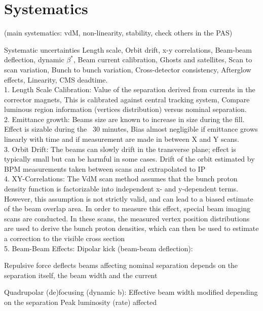 \section{Systematics}
\label{sec:syst}
(main systematics: vdM, non-linearity, stability, check others in the PAS)


Systematic uncertainties Length scale, Orbit drift, x-y correlations, Beam-beam deflection, dynamic $\beta^*$, Beam current calibration, Ghosts and satellites, Scan to scan variation, Bunch to bunch variation, Cross-detector consistency, Afterglow effects, Linearity, CMS deadtime.  \\

1. Length Scale Calibration:  Value of the separation derived from currents in the corrector magnets, This is calibrated against central tracking system, Compare luminous region information (vertices distribution) versus nominal separation. \\

2. Emittance growth: Beams size are known to increase in size during the fill. Effect is sizable during the ~30 minutes, Bias almost negligible if emittance grows linearly with time and if measurement are made in between X and Y scans. \\

3. Orbit Drift: The beams can slowly drift in the transverse plane; effect is typically small but can be harmful in some cases. Drift of the orbit estimated by BPM measurements taken between scans and extrapolated to IP \\

4. XY-Correlations: The VdM scan method assumes that the bunch proton density function is factorizable into independent x- and y-dependent terms. However, this assumption is not strictly valid, and can lead to a biased estimate of the beam overlap area. In order to measure this effect, special beam imaging scans are conducted. In these scans, the measured vertex position distributions are used to derive the bunch proton densities, which can then be used to estimate a correction to the visible cross section \\

5. Beam-Beam Effects: Dipolar kick (beam-beam deflection):

 Repulsive force deflects beams affecting nominal separation depends on the separation itself, the beam width and the current
 
 Quadrupolar (de)focusing (dynamic b):  Effective beam width modified depending on the separation Peak luminosity (rate) affected \\


